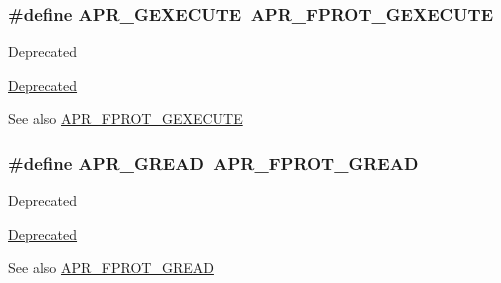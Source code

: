 \subsubsection[{\texorpdfstring{A\+P\+R\+\_\+\+G\+E\+X\+E\+C\+U\+TE}{APR_GEXECUTE}}]{\setlength{\rightskip}{0pt plus 5cm}\#define A\+P\+R\+\_\+\+G\+E\+X\+E\+C\+U\+TE~{\bf A\+P\+R\+\_\+\+F\+P\+R\+O\+T\+\_\+\+G\+E\+X\+E\+C\+U\+TE}}\hypertarget{group__apr__file__permissions_ga79ce615a96a407d6c53325a2f8cdee3d}{}\label{group__apr__file__permissions_ga79ce615a96a407d6c53325a2f8cdee3d}
\begin{DoxyRefDesc}{Deprecated}
\item[\hyperlink{deprecated__deprecated000010}{Deprecated}]\end{DoxyRefDesc}
\begin{DoxySeeAlso}{See also}
\hyperlink{group__apr__file__permissions_gab627bef3f9ceb84bbf00906eaeb12184}{A\+P\+R\+\_\+\+F\+P\+R\+O\+T\+\_\+\+G\+E\+X\+E\+C\+U\+TE} 
\end{DoxySeeAlso}
\subsubsection[{\texorpdfstring{A\+P\+R\+\_\+\+G\+R\+E\+AD}{APR_GREAD}}]{\setlength{\rightskip}{0pt plus 5cm}\#define A\+P\+R\+\_\+\+G\+R\+E\+AD~{\bf A\+P\+R\+\_\+\+F\+P\+R\+O\+T\+\_\+\+G\+R\+E\+AD}}\hypertarget{group__apr__file__permissions_ga1bd0305f31cb3bb20a8f9db898b96eb1}{}\label{group__apr__file__permissions_ga1bd0305f31cb3bb20a8f9db898b96eb1}
\begin{DoxyRefDesc}{Deprecated}
\item[\hyperlink{deprecated__deprecated000008}{Deprecated}]\end{DoxyRefDesc}
\begin{DoxySeeAlso}{See also}
\hyperlink{group__apr__file__permissions_ga5ad9b67b8008db3ffc56c3c2a65aa192}{A\+P\+R\+\_\+\+F\+P\+R\+O\+T\+\_\+\+G\+R\+E\+AD} 
\end{DoxySeeAlso}
